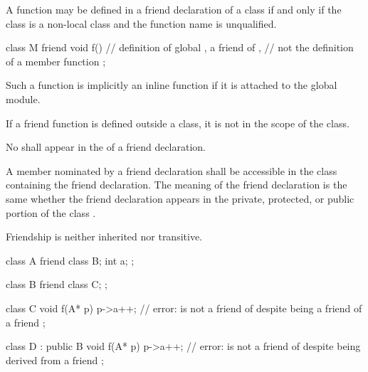 \pnum
{}%
A function may be defined in a friend declaration of a class if and only if the
class is a non-local class and the function name is unqualified.
\begin{example}
\begin{codeblock}
class M {
  friend void f() { }           // definition of global , a friend of ,
                                // not the definition of a member function
};
\end{codeblock}
\end{example}

\pnum
Such a function is implicitly an inline function
if it is attached to the global module.
\begin{note}
If a friend function is defined outside a class,
it is not in the scope of the class.
\end{note}

\pnum
No
shall appear in the
of a friend declaration.

\pnum
{}%
A member nominated by a friend declaration shall be accessible in the
class containing the friend declaration.
The meaning of the friend declaration is the same whether the friend declaration
appears in the private, protected, or public
portion of the class
.

\pnum
{}%
Friendship is neither inherited nor transitive.
\begin{example}
\begin{codeblock}
class A {
  friend class B;
  int a;
};

class B {
  friend class C;
};

class C  {
  void f(A* p) {
    p->a++;         // error:  is not a friend of  despite being a friend of a friend
  }
};

class D : public B  {
  void f(A* p) {
    p->a++;         // error:  is not a friend of  despite being derived from a friend
  }
};
\end{codeblock}
\end{example}

